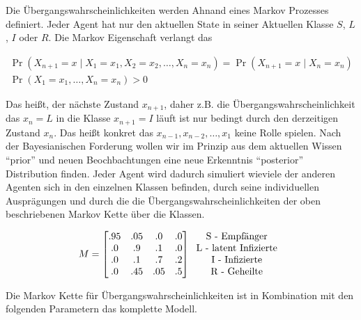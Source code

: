 \documentclass[paper=a4, fontsize=11pt, ngerman, abstract=on]{scrartcl}
\numberwithin{equation}{section} %
\numberwithin{figure}{section} %
\numberwithin{table}{section} %
\begin{document}
Die Übergangswahrscheinlichkeiten werden Ahnand eines Markov Prozesses definiert. Jeder Agent hat nur den aktuellen State in seiner Aktuellen Klasse $S$, $L$, $I$ oder $R$. Die Markov Eigenschaft verlangt das

\begin{gather*}
\Pr(X_{n+1}=x\mid X_{1}=x_{1},X_{2}=x_{2},\ldots ,X_{n}=x_{n})=\Pr(X_{n+1}=x\mid X_{n}=x_{n}) \\
\Pr(X_{1}=x_{1},\ldots,X_{n}=x_{n})>0
\end{gather*}

Das heißt, der nächste Zustand $x_{n + 1}$, daher z.B. die Übergangswahrscheinlichkeit das $x_{n} = L$ in die Klasse $x_{n + 1} = I$ läuft ist nur bedingt durch den derzeitigen Zustand $x_{n}$. Das heißt konkret das $x_{n-1}, x_{n-2}, \ldots, x_{1}$ keine Rolle spielen. Nach der Bayesianischen Forderung wollen wir im Prinzip aus dem aktuellen Wissen ``prior'' und neuen Beochbachtungen eine neue Erkenntnis ``posterior'' Distribution finden. Jeder Agent wird dadurch simuliert wieviele der anderen Agenten sich in den einzelnen Klassen befinden, durch seine individuellen Ausprägungen und durch die die Übergangswahrscheinlichkeiten der oben beschriebenen Markov Kette über die Klassen.

\[
M=
  \begin{bmatrix}
    .95 & .05 & .0 & .0 \\
    .0 & .9 & .1 & .0 \\
    .0 & .1 & .7 & .2 \\
    .0 & .45 & .05 & .5 \\
  \end{bmatrix}
  \begin{tabular}{c}
    \text{S - Empfänger} \\
    \text{L - latent Infizierte} \\
    \text{I - Infizierte} \\
    \text{R - Geheilte}
  \end{tabular}
\]

Die Markov Kette für Übergangswahrscheinlichkeiten ist in Kombination mit den folgenden Parametern das komplette Modell.
\end{document}
